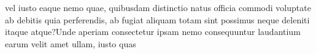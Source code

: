\documentclass[letterpaper]{article} %
\begin{document}
vel iusto eaque nemo quae, quibusdam distinctio natus officia commodi voluptate ab debitis quia perferendis, ab fugiat aliquam totam sint possimus neque deleniti itaque atque?Unde aperiam consectetur ipsam nemo consequuntur laudantium earum velit amet ullam, iusto quas


\end{document}
